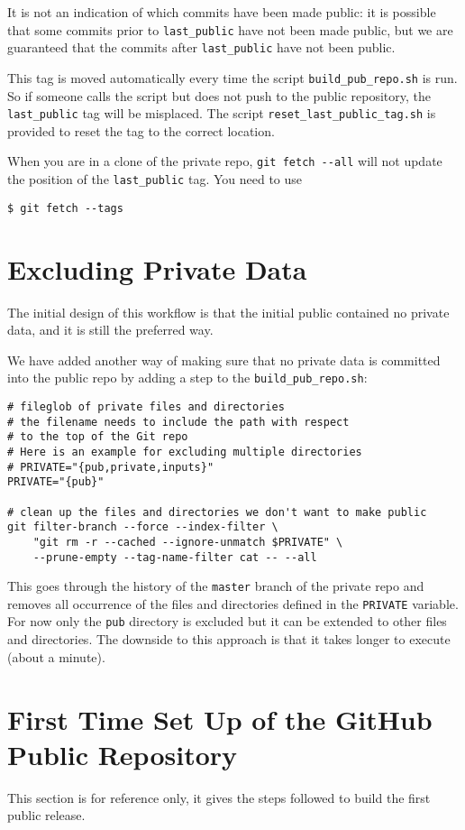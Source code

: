 \documentclass[11pt]{article}
\begin{document}
It is not an indication of which commits have been made public: it is
possible that some commits prior to \texttt{last\_public} have not
been made public, but we are guaranteed that the commits after
\texttt{last\_public} have not been public.

This tag is moved automatically every time the script
\texttt{build\_pub\_repo.sh} is run.  So if someone calls the script
but does not push to the public repository, the \texttt{last\_public}
tag will be misplaced. The script \texttt{reset\_last\_public\_tag.sh}
is provided to reset the tag to the correct location.

When you are in a clone of the private repo, \texttt{git fetch -{}-all}
will not update the position of the \texttt{last\_public}
tag. You need to use
\begin{verbatim}
$ git fetch --tags
\end{verbatim}

\section{Excluding Private Data}
\label{sec:excluding_private_data}
The initial design of this workflow is that the initial public
contained no private data, and it is still the preferred way.

We have added another way of making sure that no private data is
committed into the public repo by adding a step to the
\texttt{build\_pub\_repo.sh}:
\begin{verbatim}
# fileglob of private files and directories
# the filename needs to include the path with respect
# to the top of the Git repo
# Here is an example for excluding multiple directories
# PRIVATE="{pub,private,inputs}"
PRIVATE="{pub}"

# clean up the files and directories we don't want to make public
git filter-branch --force --index-filter \
    "git rm -r --cached --ignore-unmatch $PRIVATE" \
    --prune-empty --tag-name-filter cat -- --all
\end{verbatim}

This goes through the history of the \texttt{master} branch of the
private repo and removes all occurrence of the files and directories
defined in the \texttt{PRIVATE} variable.  For now only the
\texttt{pub} directory is excluded but it can be extended to other
files and directories.  The downside to this approach is that it takes
longer to execute (about a minute).

\section{First Time Set Up of the GitHub Public Repository}
\label{sec-5}
\label{sec:first_time}
This section is for reference only, it gives the steps followed to
build the first public release.
\end{document}
